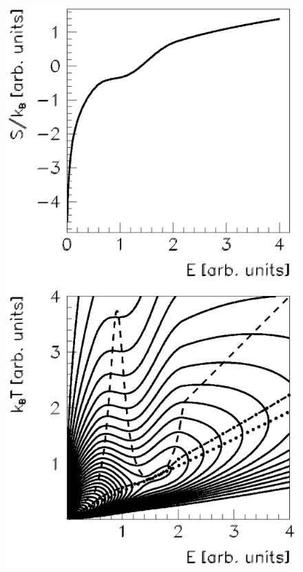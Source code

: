 \documentclass[sort&compress,final,numberedheadings]{aipproc}
\begin{document}
\begin{figure}
\includegraphics[totalheight=8cm,angle=0,bb=138 147 408 655,clip]{fig4a.ps}
\hspace*{3cm}

\end{figure}
\end{document}
